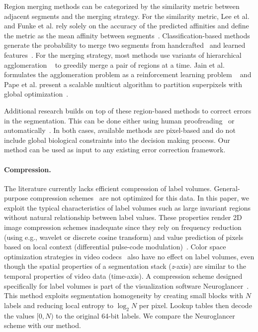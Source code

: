 Region merging methods can be categorized by the similarity metric between adjacent segments and the merging strategy.
For the similarity metric, Lee et al. and Funke et al. rely solely on the accuracy of the predicted affinities and define the metric as the mean affinity between segments~\cite{lee2017superhuman,funke2017deep}.
Classification-based methods generate the probability to merge two segments from handcrafted~\cite{seymour2016rhoananet,nunez2014graph,parag2017anisotropic,zlateski2015image,10.1371/journal.pone.0125825,jain2011learning} and learned features~\cite{bogovic2013learned}. 
For the merging strategy, most methods use variants of hierarchical agglomeration ~\cite{seymour2016rhoananet,nunez2014graph,parag2017anisotropic,zlateski2015image,10.1371/journal.pone.0125825} to greedily merge a pair of regions at a time.
Jain et al. formulates the agglomeration problem as a reinforcement learning problem ~\cite{jain2011learning} and Pape et al. present a scalable multicut algorithm to partition superpixels with global optimization~\cite{beier2017multicut}.

Additional research builds on top of these region-based methods to correct errors in the segmentation. This can be done either using human proofreading~\cite{haehn2014design,haehn2017guided,mojo2} or automatically~\cite{rolnick2017morphological,error_correction_using_CNN}. In both cases, available methods are pixel-based and do not include global biological constraints into the decision making process. Our method can be used as input to any existing error correction framework.

\paragraph{Compression.}

The literature currently lacks efficient compression of label volumes. 
General-purpose compression schemes~\cite{deutsch1996zlib,ziv1978compression,lehmann2016liblzf,oberhumer2005lzo,welch1984technique,seward1998bzip2,pavlov2007lzma,vandevenne2016zopfli,google2016brotli,collet2016smaller} are not optimized for this data.
In this paper, we exploit the typical characteristics of label volumes such as large invariant regions without natural relationship between label values. 
These properties render 2D image compression schemes inadequate since they rely on frequency reduction (using e.g., wavelet or discrete cosine transform) and value prediction of pixels based on local context (differential pulse-code modulation)~\cite{roelofs1999png,skodras2001jpeg}. 
Color space optimization strategies in video codecs~\cite{aimar2005x264} also have no effect on label volumes, even though the spatial properties of a segmentation stack (\textit{z}-axis) are similar to the temporal properties of video data (time-axis). 
A compression scheme designed specifically for label volumes is part of the visualization software Neuroglancer~\cite{google2016compressed}. 
This method exploits segmentation homogeneity by creating small blocks with $N$ labels and reducing local entropy to $\log_2{N}$ per pixel. 
Lookup tables then decode the values $[0,N)$ to the original 64-bit labels. We compare the Neuroglancer scheme with our method.
